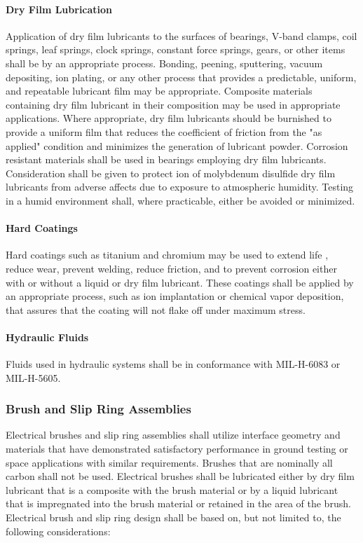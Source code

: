 \documentclass[12pt]{article}
\begin{document}
\paragraph{Dry Film Lubrication} %
Application of dry film lubricants to the surfaces of bearings, V-band clamps, coil springs, leaf springs, clock springs, constant force springs, gears, or other items shall be by an appropriate process.
Bonding, peening, sputtering, vacuum depositing, ion plating, or any other process that provides a predictable, uniform, and repeatable lubricant film may be appropriate. 
Composite materials containing dry film lubricant in their composition may be used in appropriate applications. 
Where appropriate, dry film lubricants should be burnished to provide a uniform film that reduces the coefficient of friction from the "as applied" condition and minimizes the generation of lubricant powder.
Corrosion resistant materials shall be used in bearings employing dry film lubricants. 
Consideration shall be given to protect ion of molybdenum disulfide dry film lubricants from adverse affects due to exposure to atmospheric humidity.
Testing in a humid environment shall, where practicable, either be avoided or minimized.

\paragraph{Hard Coatings} %
Hard coatings such as titanium and chromium may be used to extend life , reduce wear, prevent welding, reduce friction, and to prevent corrosion either with or without a liquid or dry film lubricant. 
These coatings shall be applied by an appropriate process, such as ion implantation or chemical vapor deposition, that assures that the coating will not flake off under maximum stress.

\paragraph{Hydraulic Fluids} %
Fluids used in hydraulic systems shall be in conformance with MIL-H-6083 or MIL-H-5605.

\subsubsection{Brush and Slip Ring Assemblies} %
Electrical brushes and slip ring assemblies shall utilize interface geometry and materials that have demonstrated satisfactory performance in ground testing or space applications with similar requirements.
Brushes that are nominally all carbon shall not be used.
Electrical brushes shall be lubricated either by dry film lubricant that is a composite with the brush material or by a liquid lubricant that is impregnated into the brush material or retained in the area of the brush. 
Electrical brush and slip ring design shall be based on, but not limited to, the following considerations:
\end{document}
